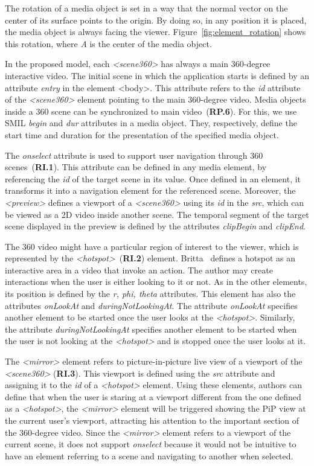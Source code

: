 The rotation of a media object is set in a
way that the normal vector on the center of its surface points to the origin.
By doing so, in any position it is placed, the media object is always facing the viewer.
Figure~\ref{fig:element_rotation} shows this rotation, where \emph{A} is the
center of the media object.

In the proposed model, each \emph{<scene360>} has always a main 360-degree
interactive video. 
The initial scene in which the application starts is defined by an attribute
\emph{entry} in the element <body>. 
This attribute refers to the \emph{id} attribute of the \emph{<scene360>}
element pointing to the main 360-degree video. 
Media objects inside a 360 scene can be synchronized to main video~(\textbf{RP.6}).
For this, we use SMIL \emph{begin} and \emph{dur} attributes in a media
object.
They, respectively, define the start time and duration for the presentation of
the specified media object.

The \emph{onselect} attribute is used to support user navigation through 360
scenes~(\textbf{RI.1}).
This attribute can be defined in any media element, by referencing the
\emph{id} of the target scene in its value.
Once defined in an element, it transforms it into a navigation element for the
referenced scene.
Moreover, the \emph{<preview>} defines a viewport of a \emph{<scene360>} using
its \emph{id} in the \emph{src}, which can be viewed as a 2D video inside
another scene.
The temporal segment of the target scene displayed in the preview is defined
by the attributes \emph{clipBegin} and \emph{clipEnd}. 

The 360 video might have a particular region of interest to the viewer, which
is represented by the \emph{<hotspot>}~(\textbf{RI.2}) element.
Britta~\cite{Britta2017} defines a hotspot as an interactive area in a video
that invoke an action.
The author may create interactions when the user is either looking to it or
not.
As in the other elements, its position is defined by the \emph{r, phi, theta}
attributes. 
This element has also the attributes \emph{onLookAt} and
\emph{duringNotLookingAt}.
The attribute \emph{onLookAt} specifies another element to be started once the
user looks at the \emph{<hotspot>}.
Similarly, the attribute \emph{duringNotLookingAt} specifies another
element to be started when the user is not looking at the \emph{<hotspot>} and
is stopped once the user looks at it.

The \emph{<mirror>} element refers to picture-in-picture live view of a
viewport of the \emph{<scene360>} (\textbf{RI.3}).
This viewport is defined using the \emph{src} attribute and assigning it to
the \emph{id} of a \emph{<hotspot>} element.
Using these elements, authors can define that when the user is staring at a
viewport different from the one defined as a \emph{<hotspot>}, the
\emph{<mirror>} element will be triggered showing the PiP view at the current
user's viewport, attracting his attention to the important section of the
360-degree video.
Since the \emph{<mirror>} element refers to a viewport of the current scene,
it does not support \emph{onselect} because it would not be intuitive to have
an element referring to a scene and navigating to another when selected.

